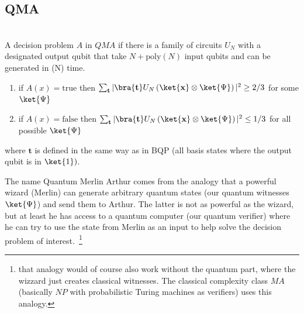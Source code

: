 \subsection{QMA}


\begin{def*}\phantom{...}\\
A decision problem $A$ in $QMA$ if there is a family of circuits $U_N$ with a designated output qubit that take $N + \text{poly}(N)$ input qubits and can be generated in (N) time.

\begin{enumerate}
    \item if $A(x)=\text{true}$ then $\sum_{\mathbf{t}} |\bra{\mathbf{t}} U_N \left(\ket{\mathbf{x}}\otimes\ket{\Psi}\right) |^2 \geq 2/3$ for some $\ket{\Psi}$
    \item if $A(x)=\text{false}$ then $\sum_{\mathbf{t}} |\bra{\mathbf{t}} U_N \left(\ket{\mathbf{x}}\otimes\ket{\Psi}\right) |^2 \leq 1/3$ for all possible $\ket{\Psi}$
\end{enumerate}
where $\mathbf{t}$ is defined in the same way as in BQP (all basis states where the output qubit is in $\ket{1})$.
\end{def*}
The name Quantum Merlin Arthur comes from the analogy that a powerful wizard (Merlin) can generate arbitrary quantum states (our quantum witnesses $\ket{\Psi}$) and send them to Arthur. The latter is not as powerful as the wizard, but at least he has access to a quantum computer (our quantum verifier) where he can try to use the state from Merlin as an input to help solve the decision problem of interest.~\footnote{that analogy would of course also work without the quantum part, where the wizzard just creates classical witnesses. The classical complexity class $MA$ (basically $NP$ with probabilistic Turing machines as verifiers) uses this analogy.}\\

